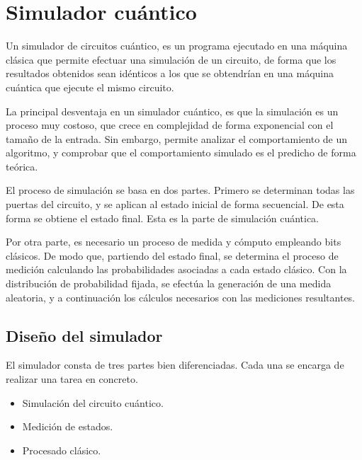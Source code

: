 \chapter{Simulador cuántico}

Un simulador de circuitos cuántico, es un programa ejecutado en una máquina 
clásica que permite efectuar una simulación de un circuito, de forma que los 
resultados obtenidos sean idénticos a los que se obtendrían en una máquina 
cuántica que ejecute el mismo circuito.

La principal desventaja en un simulador cuántico, es que la simulación es un 
proceso muy costoso, que crece en complejidad de forma exponencial con el tamaño 
de la entrada. Sin embargo, permite analizar el comportamiento de un algoritmo, 
y comprobar que el comportamiento simulado es el predicho de forma teórica.

El proceso de simulación se basa en dos partes. Primero se determinan todas las 
puertas del circuito, y se aplican al estado inicial de forma secuencial. De 
esta forma se obtiene el estado final. Esta es la parte de simulación cuántica.

Por otra parte, es necesario un proceso de medida y cómputo empleando bits 
clásicos. De modo que, partiendo del estado final, se determina el proceso de 
medición calculando las probabilidades asociadas a cada estado clásico. Con la 
distribución de probabilidad fijada, se efectúa la generación de una medida 
aleatoria, y a continuación los cálculos necesarios con las mediciones 
resultantes.

\section{Diseño del simulador}
El simulador consta de tres partes bien diferenciadas. Cada una se encarga de 
realizar una tarea en concreto.
%
\begin{itemize}
\item Simulación del circuito cuántico.
\item Medición de estados.
\item Procesado clásico.
\end{itemize}

